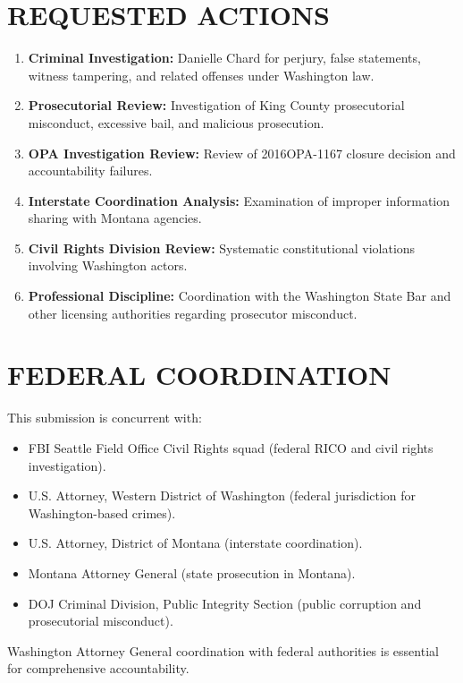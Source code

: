 \documentclass[12pt,oneside]{article}
\begin{document}
\begin{flushleft}
\section*{REQUESTED ACTIONS}

\begin{enumerate}
\item \textbf{Criminal Investigation:} Danielle Chard for perjury, false statements, witness tampering, and related offenses under Washington law.
\item \textbf{Prosecutorial Review:} Investigation of King County prosecutorial misconduct, excessive bail, and malicious prosecution.
\item \textbf{OPA Investigation Review:} Review of 2016OPA-1167 closure decision and accountability failures.
\item \textbf{Interstate Coordination Analysis:} Examination of improper information sharing with Montana agencies.
\item \textbf{Civil Rights Division Review:} Systematic constitutional violations involving Washington actors.
\item \textbf{Professional Discipline:} Coordination with the Washington State Bar and other licensing authorities regarding prosecutor misconduct.
\end{enumerate}

\section*{FEDERAL COORDINATION}

This submission is concurrent with:

\begin{itemize}
\item FBI Seattle Field Office Civil Rights squad (federal RICO and civil rights investigation).
\item U.S. Attorney, Western District of Washington (federal jurisdiction for Washington-based crimes).
\item U.S. Attorney, District of Montana (interstate coordination).
\item Montana Attorney General (state prosecution in Montana).
\item DOJ Criminal Division, Public Integrity Section (public corruption and prosecutorial misconduct).
\end{itemize}

Washington Attorney General coordination with federal authorities is essential for comprehensive accountability.


\end{flushleft}
\end{document}
